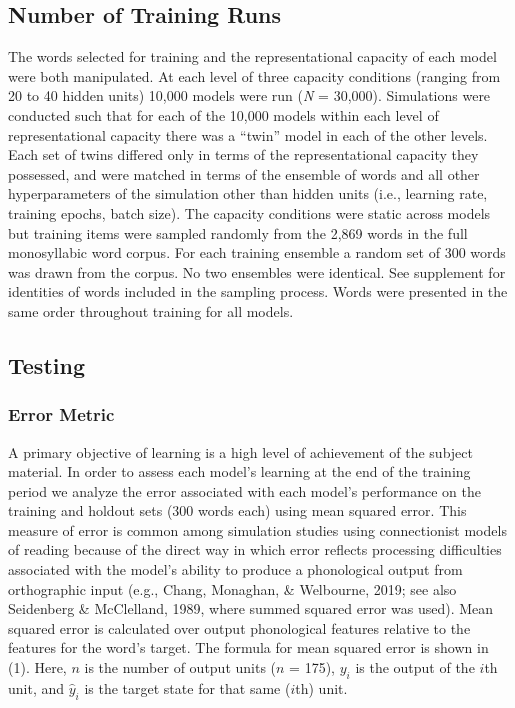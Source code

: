\documentclass[
  ,man,floatsintext]{apa6}
\begin{document}
\subsection{Number of Training Runs}\label{number-of-training-runs}

The words selected for training and the representational capacity of each model were both manipulated. At each level of three capacity conditions (ranging from 20 to 40 hidden units) 10,000 models were run (\emph{N} = 30,000). Simulations were conducted such that for each of the 10,000 models within each level of representational capacity there was a ``twin'' model in each of the other levels. Each set of twins differed only in terms of the representational capacity they possessed, and were matched in terms of the ensemble of words and all other hyperparameters of the simulation other than hidden units (i.e., learning rate, training epochs, batch size). The capacity conditions were static across models but training items were sampled randomly from the 2,869 words in the full monosyllabic word corpus. For each training ensemble a random set of 300 words was drawn from the corpus. No two ensembles were identical. See supplement for identities of words included in the sampling process. Words were presented in the same order throughout training for all models.

\subsection{Testing}\label{testing}

\subsubsection{Error Metric}\label{error-metric}

A primary objective of learning is a high level of achievement of the subject material. In order to assess each model's learning at the end of the training period we analyze the error associated with each model's performance on the training and holdout sets (300 words each) using mean squared error. This measure of error is common among simulation studies using connectionist models of reading because of the direct way in which error reflects processing difficulties associated with the model's ability to produce a phonological output from orthographic input (e.g., Chang, Monaghan, \& Welbourne, 2019; see also Seidenberg \& McClelland, 1989, where summed squared error was used). Mean squared error is calculated over output phonological features relative to the features for the word's target. The formula for mean squared error is shown in (1). Here, \(n\) is the number of output units (\(n\) = 175), \(y_i\) is the output of the \(i\)th unit, and \(\hat{y}_i\) is the target state for that same (\(i\)th) unit.
\end{document}
